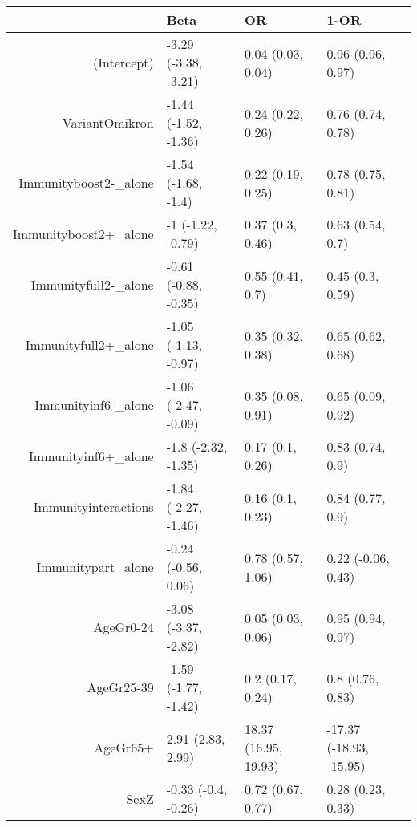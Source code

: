 \begin{table}[ht]
\centering
\begin{tabular}{rlll}
  \hline
 & Beta & OR & 1-OR \\ 
  \hline
(Intercept) & -3.29 (-3.38, -3.21) & 0.04 (0.03, 0.04) & 0.96 (0.96, 0.97) \\ 
  VariantOmikron & -1.44 (-1.52, -1.36) & 0.24 (0.22, 0.26) & 0.76 (0.74, 0.78) \\ 
  Immunityboost2-\_alone & -1.54 (-1.68, -1.4) & 0.22 (0.19, 0.25) & 0.78 (0.75, 0.81) \\ 
  Immunityboost2+\_alone & -1 (-1.22, -0.79) & 0.37 (0.3, 0.46) & 0.63 (0.54, 0.7) \\ 
  Immunityfull2-\_alone & -0.61 (-0.88, -0.35) & 0.55 (0.41, 0.7) & 0.45 (0.3, 0.59) \\ 
  Immunityfull2+\_alone & -1.05 (-1.13, -0.97) & 0.35 (0.32, 0.38) & 0.65 (0.62, 0.68) \\ 
  Immunityinf6-\_alone & -1.06 (-2.47, -0.09) & 0.35 (0.08, 0.91) & 0.65 (0.09, 0.92) \\ 
  Immunityinf6+\_alone & -1.8 (-2.32, -1.35) & 0.17 (0.1, 0.26) & 0.83 (0.74, 0.9) \\ 
  Immunityinteractions & -1.84 (-2.27, -1.46) & 0.16 (0.1, 0.23) & 0.84 (0.77, 0.9) \\ 
  Immunitypart\_alone & -0.24 (-0.56, 0.06) & 0.78 (0.57, 1.06) & 0.22 (-0.06, 0.43) \\ 
  AgeGr0-24 & -3.08 (-3.37, -2.82) & 0.05 (0.03, 0.06) & 0.95 (0.94, 0.97) \\ 
  AgeGr25-39 & -1.59 (-1.77, -1.42) & 0.2 (0.17, 0.24) & 0.8 (0.76, 0.83) \\ 
  AgeGr65+ & 2.91 (2.83, 2.99) & 18.37 (16.95, 19.93) & -17.37 (-18.93, -15.95) \\ 
  SexZ & -0.33 (-0.4, -0.26) & 0.72 (0.67, 0.77) & 0.28 (0.23, 0.33) \\ 
   \hline
\end{tabular}
\end{table}
